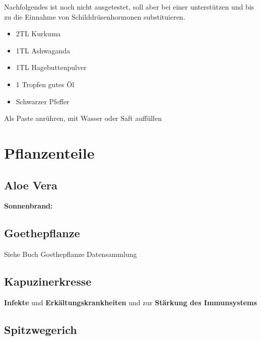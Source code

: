  
Nachfolgendes ist noch nicht ausgetestet, soll aber bei einer  unterstützen und bis zu die Einnahme von Schilddrüsenhormonen substituieren.

\begin{itemize}
	\item 2TL Kurkuma
	\item 1TL Ashwaganda
	\item 1TL Hagebuttenpulver
	\item 1 Tropfen gutes Öl
	\item Schwarzer Pfeffer
\end{itemize}

Als Paste anrühren, mit Wasser oder Saft auffüllen



\newpage




\section{Pflanzenteile}


\subsection{Aloe Vera}


\textbf{Sonnenbrand:}


\subsection{Goethepflanze}


Siehe Buch Goethepflanze Datensammlung



\subsection{Kapuzinerkresse}


\textbf{Infekte} und \textbf{Erkältungskrankheiten} und zur \textbf{Stärkung des Immunsystems}

  






\subsection{Spitzwegerich}

